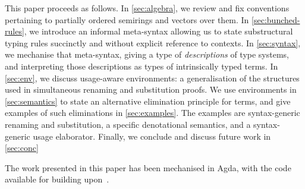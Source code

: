 This paper proceeds as follows.
In \cref{sec:algebra}, we review and fix conventions pertaining to partially
ordered semirings and vectors over them.
In \cref{sec:bunched-rules}, we introduce an informal meta-syntax allowing us
to state substructural typing rules succinctly and without explicit reference
to contexts.
In \cref{sec:syntax}, we mechanise that meta-syntax, giving a type of
\emph{descriptions} of type systems, and interpreting those descriptions as
types of intrinsically typed terms.
In \cref{sec:env}, we discuss usage-aware environments: a generalisation of
the structures used in simultaneous renaming and substitution proofs.
We use environments in \cref{sec:semantics} to state an alternative
elimination principle for terms, and give examples of such eliminations in
\cref{sec:examples}.
The examples are syntax-generic renaming and substitution, a specific
denotational semantics, and a syntax-generic usage elaborator.
Finally, we conclude and discuss future work in \cref{sec:conc}

The work presented in this paper has been mechanised in Agda,
with the code available for building upon~\cite{generic-lr}.
